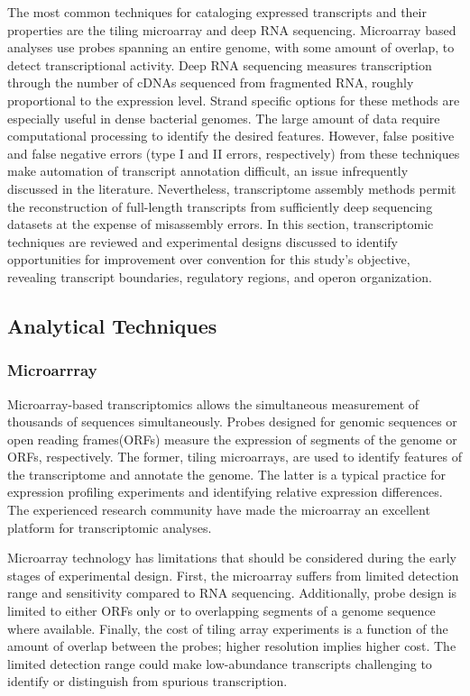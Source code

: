 The most common techniques for cataloging expressed transcripts and their properties are the tiling microarray\cite{162} and deep RNA sequencing\cite{115}. Microarray based analyses use probes spanning an entire genome, with some amount of overlap, to detect transcriptional activity.\cite{196} Deep RNA sequencing\cite{115} measures transcription through the number of cDNAs sequenced from fragmented RNA, roughly proportional to the expression level.\cite{197} Strand specific options for these methods are especially useful in dense bacterial genomes.\cite{162,115} The large amount of data require computational processing to identify the desired features.\cite{198,199} However, false positive and false negative errors (type I and II errors, respectively) from these techniques make automation of transcript annotation difficult, an issue infrequently discussed in the literature. Nevertheless, transcriptome assembly methods permit the reconstruction of full-length transcripts from sufficiently deep sequencing datasets at the expense of misassembly errors.\cite{108} In this section, transcriptomic techniques are reviewed and experimental designs discussed to identify opportunities for improvement over convention for this study's objective, revealing transcript boundaries, regulatory regions, and operon organization.

\subsection{Analytical Techniques}
\subsubsection{Microarrray}
Microarray-based transcriptomics allows the simultaneous measurement of thousands of sequences simultaneously.\cite{151} Probes designed for genomic sequences or open reading frames(ORFs) measure the expression of segments of the genome or ORFs, respectively. The former, tiling microarrays, are used to identify features of the transcriptome and annotate the genome. The latter is a typical practice for expression profiling experiments and identifying relative expression differences.\cite{151,162} The experienced research community have made the microarray an excellent platform for transcriptomic analyses.

Microarray technology has limitations that should be considered during the early stages of experimental design. First, the microarray suffers from limited detection range and sensitivity compared to RNA sequencing.\cite{163} Additionally, probe design is limited to either ORFs only or to overlapping segments of a genome sequence where available.\cite{153} Finally, the cost of tiling array experiments is a function of the amount of overlap between the probes; higher resolution implies higher cost.\cite{163} The limited detection range could make low-abundance transcripts challenging to identify or distinguish from spurious transcription.\cite{164,165}

